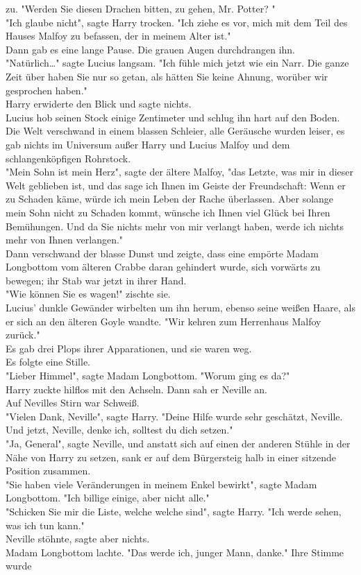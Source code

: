 {zu. "Werden Sie diesen Drachen bitten, zu gehen, Mr. Potter? "\\ "Ich glaube nicht", sagte Harry trocken. "Ich ziehe es vor, mich mit dem Teil des Hauses Malfoy zu befassen, der in meinem Alter ist."\\ Dann gab es eine lange Pause. Die grauen Augen durchdrangen ihn.\\ "Natürlich…" sagte Lucius langsam. "Ich fühle mich jetzt wie ein Narr. Die ganze Zeit über haben Sie nur so getan, als hätten Sie keine Ahnung, worüber wir gesprochen haben."\\ Harry erwiderte den Blick und sagte nichts.\\ Lucius hob seinen Stock einige Zentimeter und schlug ihn hart auf den Boden.\\ Die Welt verschwand in einem blassen Schleier, alle Geräusche wurden leiser, es gab nichts im Universum außer Harry und Lucius Malfoy und dem schlangenköpfigen Rohrstock.\\ "Mein Sohn ist mein Herz", sagte der ältere Malfoy, "das Letzte, was mir in dieser Welt geblieben ist, und das sage ich Ihnen im Geiste der Freundschaft: Wenn er zu Schaden käme, würde ich mein Leben der Rache überlassen. Aber solange mein Sohn nicht zu Schaden kommt, wünsche ich Ihnen viel Glück bei Ihren Bemühungen. Und da Sie nichts mehr von mir verlangt haben, werde ich nichts mehr von Ihnen verlangen."\\ Dann verschwand der blasse Dunst und zeigte, dass eine empörte Madam Longbottom vom älteren Crabbe daran gehindert wurde, sich vorwärts zu bewegen; ihr Stab war jetzt in ihrer Hand.\\ "Wie können Sie es wagen!" zischte sie.\\ Lucius' dunkle Gewänder wirbelten um ihn herum, ebenso seine weißen Haare, als er sich an den älteren Goyle wandte. "Wir kehren zum Herrenhaus Malfoy zurück."\\ Es gab drei Plops ihrer Apparationen, und sie waren weg.\\ Es folgte eine Stille.\\ "Lieber Himmel", sagte Madam Longbottom. "Worum ging es da?"\\ Harry zuckte hilflos mit den Achseln. Dann sah er Neville an.\\ Auf Nevilles Stirn war Schweiß.\\ "Vielen Dank, Neville", sagte Harry. "Deine Hilfe wurde sehr geschätzt, Neville. Und jetzt, Neville, denke ich, solltest du dich setzen."\\ "Ja, General", sagte Neville, und anstatt sich auf einen der anderen Stühle in der Nähe von Harry zu setzen, sank er auf dem Bürgersteig halb in einer sitzende Position zusammen.\\ "Sie haben viele Veränderungen in meinem Enkel bewirkt", sagte Madam Longbottom. "Ich billige einige, aber nicht alle."\\ "Schicken Sie mir die Liste, welche welche sind", sagte Harry. "Ich werde sehen, was ich tun kann."\\ Neville stöhnte, sagte aber nichts.\\ Madam Longbottom lachte. "Das werde ich, junger Mann, danke." Ihre Stimme wurde }
